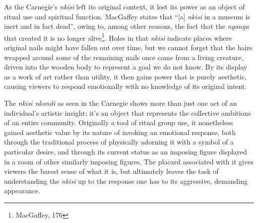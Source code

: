 As the Carnegie's \textit{nkisi} left its original context, it lost its power as
an object of ritual use and spiritual function. MacGaffey states that ``[a]
\textit{nkisi} in a museum is inert and in fact dead'', owing to, among other
reasons, the fact that the \textit{nganga} that created it is no longer
alive\footnote{MacGaffey, 176}. Holes in that \textit{nkisi} indicate places
where original nails might have fallen out over time, but we cannot forget that
the hairs wrapped around some of the remaining nails once came from a living
creature, driven into the wooden body to represent a goal we do not know. By its
display as a work of art rather than utility, it then gains power that is purely
aesthetic, causing viewers to respond emotionally with no knowledge of its
original intent.

The \textit{nkisi nkondi} as seen in the Carnegie shows more than just one act
of an individual's artistic insight; it's an object that represents the
collective ambitions of an entire community. Originally a tool of ritual group
use, it nonetheless gained aesthetic value by its nature of invoking an
emotional response, both through the traditional process of physically adorning
it with a symbol of a particular desire, and through its current status as an
imposing figure displayed in a room of other similarly imposing figures. The
placard associated with it gives viewers the barest sense of what it is, but
ultimately leaves the task of understanding the \textit{nkisi} up to the
response one has to its aggressive, demanding appearance.
